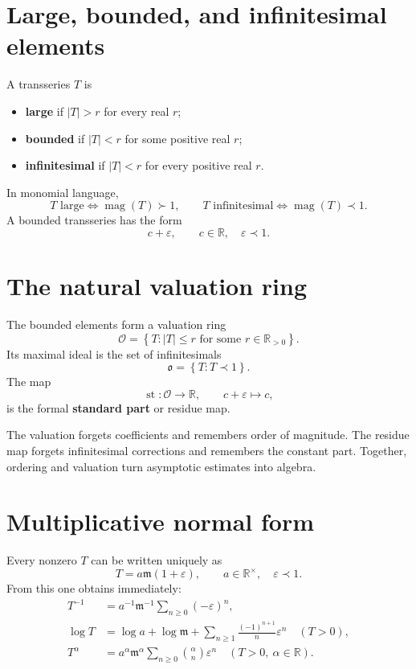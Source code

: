 \documentclass[11pt,openany]{book}
\theoremstyle{plain}
\theoremstyle{definition}
\theoremstyle{remark}
\newcommand{\R}{\mathbb{R}}
\newcommand{\m}{\mathfrak{m}}
\newcommand{\magop}{\operatorname{mag}}
\newcommand{\set}[1]{\left\{#1\right\}}
\newcommand{\defterm}[1]{\textbf{#1}}
\begin{document}
\section{Large, bounded, and infinitesimal elements}
A transseries $T$ is
\begin{itemize}
\item \defterm{large} if $|T|>r$ for every real $r$;
\item \defterm{bounded} if $|T|<r$ for some positive real $r$;
\item \defterm{infinitesimal} if $|T|<r$ for every positive real $r$.
\end{itemize}
In monomial language,
\[
  T\text{ large}\iff \magop(T)\succ1,
  \qquad
  T\text{ infinitesimal}\iff \magop(T)\prec1.
\]
A bounded transseries has the form
\[
  c+\varepsilon,
  \qquad c\in\R,
  \quad\varepsilon\prec1.
\]

\section{The natural valuation ring}
The bounded elements form a valuation ring
\[
  \mathcal O=\set{T:|T|\le r\text{ for some }r\in\R_{>0}}.
\]
Its maximal ideal is the set of infinitesimals
\[
  \mathfrak o=\set{T:T\prec1}.
\]
The map
\[
  \operatorname{st}:\mathcal O\to\R,
  \qquad c+\varepsilon\mapsto c,
\]
is the formal \defterm{standard part} or residue map.

\begin{intuitionbox}
The valuation forgets coefficients and remembers order of magnitude. The residue map forgets infinitesimal corrections and remembers the constant part. Together, ordering and valuation turn asymptotic estimates into algebra.
\end{intuitionbox}

\section{Multiplicative normal form}
Every nonzero $T$ can be written uniquely as
\[
  T=a\m(1+\varepsilon),
  \qquad a\in\R^\times,
  \quad \varepsilon\prec1.
\]
From this one obtains immediately:
\begin{align*}
  T^{-1}
  &=a^{-1}\m^{-1}\sum_{n\ge0}(-\varepsilon)^n,\\
  \log T
  &=\log a+\log\m+
    \sum_{n\ge1}\frac{(-1)^{n+1}}{n}\varepsilon^n
    \quad (T>0),\\
  T^\alpha
  &=a^\alpha\m^\alpha
    \sum_{n\ge0}\binom{\alpha}{n}\varepsilon^n
    \quad (T>0,\ \alpha\in\R).
\end{align*}
\end{document}
